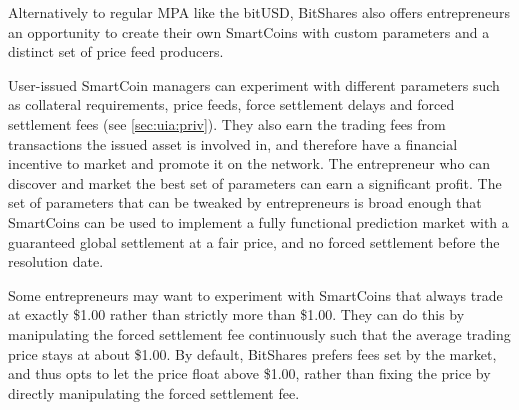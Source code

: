 Alternatively to regular MPA like the bitUSD, BitShares also offers
entrepreneurs an opportunity to create their own SmartCoins with custom
parameters and a distinct set of price feed producers.

User-issued SmartCoin managers can experiment with different parameters such as
collateral requirements, price feeds, force settlement delays and forced
settlement fees (see \cref{sec:uia:priv}). They also earn the trading fees from
transactions the issued asset is involved in, and therefore have a financial
incentive to market and promote it on the network. The entrepreneur who can
discover and market the best set of parameters can earn a significant profit.
The set of parameters that can be tweaked by entrepreneurs is broad enough that
SmartCoins can be used to implement a fully functional prediction market with a
guaranteed global settlement at a fair price, and no forced settlement before
the resolution date.

Some entrepreneurs may want to experiment with SmartCoins that always trade at
exactly \$1.00 rather than strictly more than \$1.00. They can do this by
manipulating the forced settlement fee continuously such that the average
trading price stays at about \$1.00. By default, BitShares prefers fees set by
the market, and thus opts to let the price float above \$1.00, rather than
fixing the price by directly manipulating the forced settlement fee.
